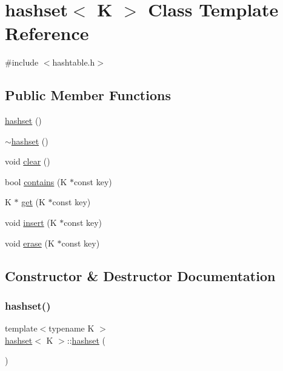 \hypertarget{classhashset}{}\section{hashset$<$ K $>$ Class Template Reference}
\label{classhashset}


{\ttfamily \#include $<$hashtable.\+h$>$}

\subsection*{Public Member Functions}
\begin{DoxyCompactItemize}
\item 
\hyperlink{classhashset_a58740226f56122a04eb1f5122b21dc28}{hashset} ()
\item 
\hyperlink{classhashset_a6dfea39f30e30519e3808ce3989dad10}{$\sim$hashset} ()
\item 
void \hyperlink{classhashset_a137e69aebc7f357881fac8adfef0e102}{clear} ()
\item 
bool \hyperlink{classhashset_af90785af306bbe96d2e07f8ad0842a06}{contains} (K $\ast$const key)
\item 
K $\ast$ \hyperlink{classhashset_aa19cc2749ccc333c0e5a7a0907ddaf68}{get} (K $\ast$const key)
\item 
void \hyperlink{classhashset_af64166df73b9d40ffca8c7ed131e849b}{insert} (K $\ast$const key)
\item 
void \hyperlink{classhashset_a4fe539e3a2242f64bf64df7b4a8aa105}{erase} (K $\ast$const key)
\end{DoxyCompactItemize}


\subsection{Constructor \& Destructor Documentation}
\mbox{\label{classhashset_a58740226f56122a04eb1f5122b21dc28}} 
\subsubsection{\texorpdfstring{hashset()}{hashset()}}
{\footnotesize\ttfamily template$<$typename K $>$ \\
\hyperlink{classhashset}{hashset}$<$ K $>$\+::\hyperlink{classhashset}{hashset} (\begin{DoxyParamCaption}{ }\end{DoxyParamCaption})\hspace{0.3cm}{\ttfamily [inline]}}

